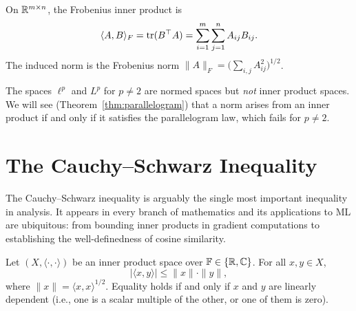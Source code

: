 \documentclass[11pt,a4paper]{article}
\begin{document}
\begin{example}
\label{ex:frobenius}
On $\mathbb{R}^{m \times n}$, the Frobenius inner product is
\[
\langle A, B \rangle_F = \operatorname{tr}(B^\top A) = \sum_{i=1}^m \sum_{j=1}^n A_{ij} B_{ij}.
\]
The induced norm is the Frobenius norm
$\|A\|_F = \bigl(\sum_{i,j} A_{ij}^2\bigr)^{1/2}$.
\end{example}

\begin{warning}[title={Not Every Norm Comes from an Inner Product}]
The spaces $\ell^p$ and $L^p$ for $p \ne 2$ are normed spaces but \emph{not}
inner product spaces. We will see (Theorem~\ref{thm:parallelogram}) that a
norm arises from an inner product if and only if it satisfies the
parallelogram law, which fails for $p \ne 2$.
\end{warning}


\section{The Cauchy--Schwarz Inequality}
\label{sec:cauchy_schwarz}

The Cauchy--Schwarz inequality is arguably the single most important
inequality in analysis. It appears in every branch of mathematics and its
applications to ML are ubiquitous: from bounding inner products in gradient
computations to establishing the well-definedness of cosine similarity.

\begin{theorem}
\label{thm:cauchy_schwarz}
Let $(X, \langle \cdot, \cdot \rangle)$ be an inner product space over
$\mathbb{F} \in \{\mathbb{R}, \mathbb{C}\}$. For all $x, y \in X$,
\[
|\langle x, y \rangle| \le \|x\| \cdot \|y\|,
\]
where $\|x\| = \langle x, x \rangle^{1/2}$. Equality holds if and only if
$x$ and $y$ are linearly dependent (i.e., one is a scalar multiple of the
other, or one of them is zero).
\end{theorem}
\end{document}
